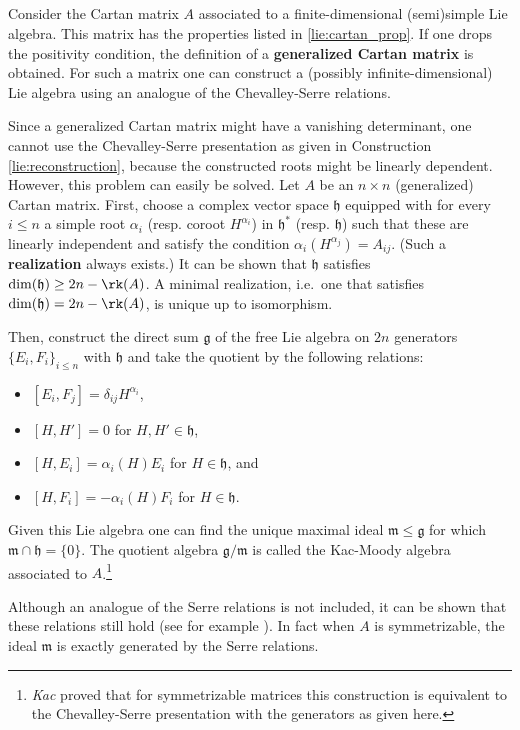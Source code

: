 \subsection{}

    \begin{construct}\label{lie:kac_moody}
        Consider the Cartan matrix $A$ associated to a finite-dimensional (semi)simple Lie algebra. This matrix has the properties listed in \ref{lie:cartan_prop}. If one drops the positivity condition, the definition of a \textbf{generalized Cartan matrix} is obtained. For such a matrix one can construct a (possibly infinite-dimensional) Lie algebra using an analogue of the Chevalley-Serre relations.

        Since a generalized Cartan matrix might have a vanishing determinant, one cannot use the Chevalley-Serre presentation as given in Construction \ref{lie:reconstruction}, because the constructed roots might be linearly dependent. However, this problem can easily be solved. Let $A$ be an $n\times n$ (generalized) Cartan matrix. First, choose a complex vector space $\mathfrak{h}$ equipped with for every $i\leq n$ a simple root $\alpha_i$ (resp. coroot $H^{\alpha_i}$) in $\mathfrak{h}^*$ (resp. $\mathfrak{h}$) such that these are linearly independent and satisfy the condition $\alpha_i(H^{\alpha_j})=A_{ij}$. (Such a \textbf{realization} always exists.) It can be shown that $\mathfrak{h}$ satisfies $\dim(\mathfrak{h})\geq2n-\rk(A)$. A minimal realization, i.e.~one that satisfies $\dim(\mathfrak{h})=2n-\rk(A)$, is unique up to isomorphism.

        Then, construct the direct sum $\mathfrak{g}$ of the free Lie algebra on $2n$ generators $\{E_i,F_i\}_{i\leq n}$ with $\mathfrak{h}$ and take the quotient by the following relations:
        \begin{itemize}
            \item $[E_i,F_j] = \delta_{ij}H^{\alpha_i}$,
            \item $[H,H']=0$ for $H,H'\in\mathfrak{h}$,
            \item $[H,E_i]=\alpha_i(H)E_i$ for $H\in\mathfrak{h}$, and
            \item $[H,F_i]=-\alpha_i(H)F_i$ for $H\in\mathfrak{h}$.
        \end{itemize}
        Given this Lie algebra one can find the unique maximal ideal $\mathfrak{m}\leq\mathfrak{g}$ for which $\mathfrak{m}\cap\mathfrak{h}=\{0\}$. The quotient algebra $\mathfrak{g}/\mathfrak{m}$ is called the Kac-Moody algebra associated to $A$.\footnote{\textit{Kac} proved that for symmetrizable matrices this construction is equivalent to the Chevalley-Serre presentation with the generators as given here.}

        Although an analogue of the Serre relations is not included, it can be shown that these relations still hold (see for example \cite{aminiinfinite}). In fact when $A$ is symmetrizable, the ideal $\mathfrak{m}$ is exactly generated by the Serre relations.
    \end{construct}

